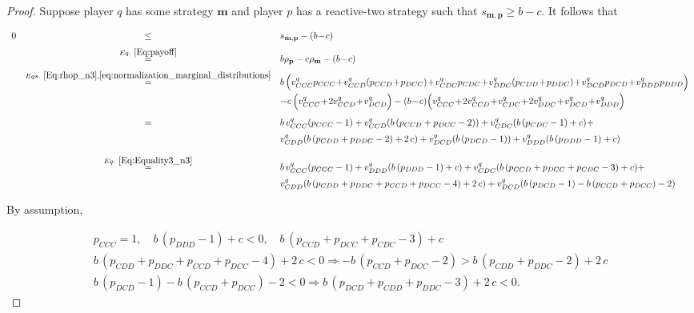 \documentclass{article}
\theoremstyle{definition}
\begin{document}
\begin{proof}

Suppose player $q$ has some strategy $\mathbf{m}$ and player $p$ has a reactive-two
strategy such that $s_{\mathbf{m}, \mathbf{p}} \ge b\!-\!c$. It follows that

\begin{equation}\label{Eq:InequalityGoodN3}
\begin{array}{rcl}
0 &\le	&s_{\mathbf{m}, \mathbf{p}}-(b\!-\!c)\\[0.2cm]
	&\stackrel{Eq.~\eqref{Eq:payoff}}{=}	&b\rho_\mathbf{p} - c\rho_\mathbf{m}-(b\!-\!c)\\[0.2cm]
	&\stackrel{Eqs.~\eqref{Eq:rhop_n3}, \eqref{eq:normalization_marginal_distributions}}{=}	& 
  b\,\Big( v^q_{CCC} p_{CCC} \!+\!  v^q_{CCD}(p_{CCD}\!+\!p_{DCC}) \!+\! v^q_{CDC} p_{CDC} \!+\! v^q_{DDC}(p_{CDD}\!+\!p_{DDC}) \!+\! v^q_{DCD} p_{DCD} \!+\! v^q_{DDD} p_{DDD}\Big) \\ [0.2cm]
  & & - c\,\Big(v^q_{CCC} \!+\! 2 v^q_{CCD} \!+\! v^q_{DCD}\Big) - (b\!-\!c)\Big(v^q_{CCC} \!+\! 2 v^q_{CCD} \!+\! v^q_{CDC} \!+\! 2 v^q_{DDC} \!+\! v^q_{DCD} \!+\! v^q_{DDD} \Big) \\ [0.4cm]
  & = & b\, v^q_{CCC} (p_{CCC} - 1) + v^q_{CCD} (b\, (p_{CCD} + p_{DCC} - 2)) + v^q_{CDC} (b\, (p_{CDC} - 1) + c) + \\ [0.2cm]
  & & v^q_{CDD} (b\, (p_{CDD} + p_{DDC} - 2) + 2\, c) + v^q_{DCD} (b\, (p _{DCD} - 1)) + v^q_{DDD} (b\, (p _{DDD} - 1) + c) \\ [0.4cm]
  &\stackrel{Eq.~\eqref{Eq:Equality3_n3}}{=}	& b\, v^q_{CCC} (p_{CCC} - 1) + v^q_{DDD} (b\, (p _{DDD} - 1) + c) + v^q_{CDC} (b\, (p_{CCD} + p_{DCC} + p_{CDC}- 3) + c) + \\ [0.2cm]
  & & v^q_{CDD} (b\, (p_{CDD} + p_{DDC} + p_{CCD} + p_{DCC} - 4) + 2\, c) + v^q_{DCD} (b\, (p _{DCD}  - 1) -  b\, (p_{CCD} + p_{DCC}) - 2)
\end{array}
\end{equation}

By assumption,

\begin{equation*}
\begin{array}{c}
p_{CCC} = 1, \quad b\, (p _{DDD} - 1) + c < 0,  \quad b\, (p_{CCD} + p_{DCC} + p_{CDC}- 3) + c \\ [0.4cm]
b\, (p_{CDD} + p_{DDC} + p_{CCD} + p_{DCC} - 4) + 2\, c < 0 \Rightarrow - b\, (p_{CCD} + p_{DCC} - 2) > b\, (p_{CDD} + p_{DDC} - 2) + 2\, c \\ [0.4cm]
b\, (p _{DCD}  - 1) -  b\, (p_{CCD} + p_{DCC}) - 2 < 0 \Rightarrow  b\, (p _{DCD} + p_{CDD} + p_{DDC} - 3) + 2\, c < 0.
\end{array}
\end{equation*}


\end{proof}
\end{document}
